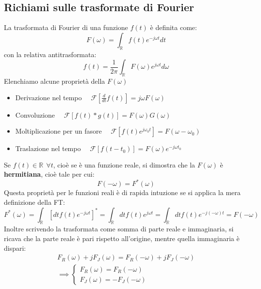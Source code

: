 \documentclass{book}
\begin{document}
            \subsection{Richiami sulle trasformate di Fourier}
                La trasformata di Fourier di una funzione $f(t)$ è definita come:
                \begin{equation}
                    F(\omega) = \int_{\mathbb{R}} f(t)e^{-j \omega t}dt
                \end{equation}
                con la relativa antitrasformata:
                \begin{equation}
                    f(t) = \frac{1}{2\pi} \int_{\mathbb{R}} F(\omega) e^{j \omega t} d \omega
                \end{equation}
                Elenchiamo alcune proprietà della $F(\omega)$
                \begin{itemize}
                    \item Derivazione nel tempo \ \ $\mathcal{F}[\frac{d}{dt}f(t)] = j \omega F(\omega)$
                    \item Convoluzione \ \ $\mathcal{F}[f(t)*g(t)] = F(\omega) G(\omega)$
                    \item Moltiplicazione per un fasore \ \ $\mathcal{F}[f(t)e^{j \omega_{0}t}] = F(\omega - \omega_{0})$
                    \item Traslazione nel tempo \ \ $\mathcal{F}[f(t-t_{0})] = F(\omega)e^{-j \omega t_{0}}$
                \end{itemize}
                Se $f(t) \in \mathbb{R} \ \ \forall t$, cioè se è una funzione reale, si dimostra che la $F(\omega)$ è \textbf{hermitiana}, cioè tale per cui:
                \begin{equation}
                    F(- \omega) = F^{*}(\omega)
                \end{equation}
                Questa proprietà per le funzioni reali è di rapida intuzione se si applica la mera definizione della FT:
                \begin{equation}
                    F^{*}(\omega) = \int_{\mathbb{R}} [dt f(t)e^{-j \omega t}]^{*} = \int_{\mathbb{R}} dt f(t)e^{j \omega t} = \int_{\mathbb{R}} dt f(t) e^{-j(-\omega) t} = F(-\omega)
                \end{equation}
                Inoltre scrivendo la trasformata come somma di parte reale e immaginaria, si ricava che la parte reale è pari rispetto all'origine, mentre quella immaginaria è dispari:
                \begin{align}
                    F_{R}(\omega)+jF_{J}(\omega) = F_{R}(-\omega)+jF_{J}(-\omega) \\
                    \implies \begin{cases}
                        F_{R}(\omega) = F_{R}(-\omega) \\
                        F_{J}(\omega) = - F_{J}(-\omega)
                    \end{cases}
                \end{align}
\end{document}

